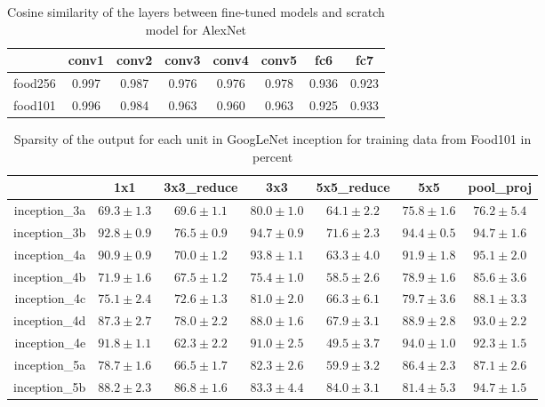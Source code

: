 \begin{table}[htbp]
  \centering
  \caption{Cosine similarity of the layers between fine-tuned models and scratch model for AlexNet}
    \begin{tabular}{r|ccccccc}
    \toprule
          & conv1 & conv2 & conv3 & conv4 & conv5 & fc6   & fc7 \\
    \midrule
    food256 & 0.997 & 0.987 & 0.976 & 0.976 & 0.978 & 0.936 & 0.923 \\
    food101 & 0.996 & 0.984 & 0.963 & 0.960 & 0.963 & 0.925 & 0.933 \\
    \bottomrule
    \end{tabular}%
  \label{tab:cosa}%
\end{table}%

\begin{table}[htbp]
  \centering
  \caption{Sparsity of the output for each unit in GoogLeNet inception for training data from Food101 in percent}
    \begin{tabular}{r|cccccc}
    \toprule
          & 1x1  & 3x3\_reduce & 3x3  & 5x5\_reduce & 5x5  & pool\_proj  \\
    \midrule
    inception\_3a & $69.3\pm 1.3$  & $69.6 \pm 1.1$  & $80.0\pm  1.0$& $64.1\pm  2.2$& $75.8\pm  1.6$& $76.2\pm 5.4$\\
    inception\_3b & $92.8 \pm 0.9$&$ 76.5 \pm 0.9$& $94.7\pm 0.9 $&$ 71.6 \pm 2.3 $&$ 94.4\pm 0.5 $&$ 94.7 \pm 1.6$\\
    inception\_4a & $90.9 \pm 0.9$& $70.0\pm 1.2 $& $93.8\pm 1.1 $& $63.3\pm 4.0 $& $91.9\pm 1.8 $& $95.1\pm 2.0$\\
    inception\_4b & $71.9 \pm 1.6$& $67.5\pm 1.2$ & $75.4\pm  1.0$& $58.5 \pm 2.6$& $78.9\pm  1.6$& $85.6\pm 3.6$\\
    inception\_4c & $75.1 \pm 2.4$& $72.6 \pm 1.3$& $81.0\pm 2.0$ & $66.3\pm 6.1 $& $79.7 \pm 3.6$& $88.1\pm 3.3$\\
    inception\_4d & $87.3 \pm 2.7$& $78.0 \pm 2.2$& $88.0\pm 1.6$& $67.9\pm 3.1 $& $88.9\pm 2.8 $& $93.0\pm 2.2$\\
    inception\_4e & $91.8\pm  1.1$& $62.3\pm 2.2 $& $91.0\pm 2.5 $& $49.5 \pm 3.7$& $94.0 \pm 1.0$& $92.3\pm 1.5$\\
    inception\_5a & $78.7 \pm 1.6$& $66.5\pm  1.7$& $82.3\pm 2.6 $& $59.9\pm 3.2 $& $86.4\pm 2.3 $& $87.1\pm 2.6$\\
    inception\_5b & $88.2\pm 2.3 $& $86.8 \pm 1.6$&$ 83.3\pm 4.4$ & $84.0\pm 3.1 $& $81.4\pm 5.3$  & $94.7\pm 1.5$\\
    \bottomrule
    \end{tabular}%
  \label{tab:addlabel}%
\end{table}%



